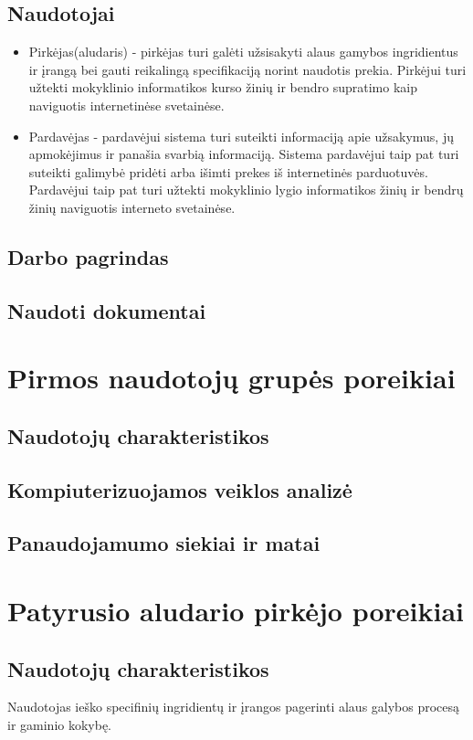 \documentclass[oneside]{VUMIFPSkursinis}
\begin{document}
	\subsection{Naudotojai}
		\begin{itemize}
			\item{Pirkėjas(aludaris) - pirkėjas turi galėti užsisakyti alaus gamybos ingridientus ir įrangą bei gauti reikalingą specifikaciją norint naudotis prekia. 
				Pirkėjui turi užtekti mokyklinio informatikos kurso žinių ir bendro supratimo kaip naviguotis internetinėse svetainėse.}
			\item{Pardavėjas - pardavėjui sistema turi suteikti informaciją apie užsakymus, jų apmokėjimus ir panašia svarbią informaciją. 
				Sistema pardavėjui taip pat turi suteikti galimybė pridėti arba išimti prekes iš internetinės parduotuvės. 
				Pardavėjui taip pat turi užtekti mokyklinio lygio informatikos žinių ir bendrų žinių naviguotis interneto svetainėse.}
		\end{itemize}
	\subsection{Darbo pagrindas}
	\subsection{Naudoti dokumentai}

\section{Pirmos naudotojų grupės poreikiai}
	\subsection{Naudotojų charakteristikos}
	\subsection{Kompiuterizuojamos veiklos analizė}
	\subsection{Panaudojamumo siekiai ir matai}

\section{Patyrusio aludario pirkėjo poreikiai}
	\subsection{Naudotojų charakteristikos}
		Naudotojas ieško specifinių ingridientų ir įrangos pagerinti alaus galybos procesą ir gaminio kokybę.
\end{document}
